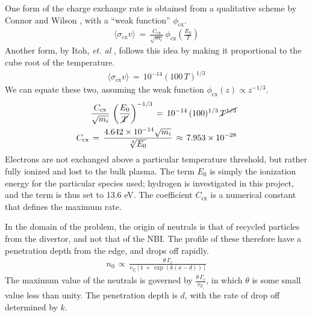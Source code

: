 One form of the charge exchange rate is obtained from a qualitative scheme by Connor and Wilson \cite{connor_review_2000}, with a ``weak function'' $\phi_\text{cx}$.
\begin{align} %
	\langle \sigma_\text{cx} v\rangle \,=\, \frac{C_\text{cx}}{\sqrt{m_i}} \,
		\phi_\text{cx}\left(\frac{E_0}{T}\right) \label{eq:connor_cx_rate}
\end{align}
Another form, by Itoh, \emph{et. al} \cite{itoh_model_1989}, follows this idea by making it proportional to the cube root of the temperature.
\begin{align} %
	\langle \sigma_\text{cx} v\rangle \,=\, 10^{-14}
		\left(100 \, T\right)^{1/3} \label{eq:itoh_cx_rate}
\end{align}
We can equate these two, assuming the weak function $\phi_\text{cx}(z) \propto z^{-1/3}$.
\begin{align}
	\frac{C_\text{cx}}{\sqrt{m_i}} \, \left(\frac{E_0}{\cancel{T}}\right)^{-1/3}
		\,=\, 10^{-14} \, (100)^{1/3} \, \cancel{T^{1/3}} \\
	C_\text{cx} \,=\, \frac{4.642\times 10^{-14} \sqrt{m_i}}{\sqrt[3]{E_0}}
		\,\approx\, 7.953\times 10^{-28}
\end{align}
Electrons are not exchanged above a particular temperature threshold, but rather fully ionized and lost to the bulk plasma.
The term $E_0$ is simply the ionization energy for the particular species used; hydrogen is investigated in this project, and the term is thus set to 13.6 eV.
The coefficient $C_\text{cx}$ is a numerical constant that defines the maximum rate.

In the domain of the problem, the origin of neutrals is that of recycled particles from the divertor, and not that of the NBI.
The profile of these therefore have a penetration depth from the edge, and drops off rapidly.
\begin{align} %
	n_0 \,\propto\, \frac{\theta\,\Gamma_c}{v_{T_i}\left[1 \,+\,
		\exp{(k(x - d))}\right]} \label{eq:neutral_density}
\end{align}
The maximum value of the neutrals is governed by $\frac{\theta\,\Gamma_c}{v_{T_i}}$, in which $\theta$ is some small value less than unity.
The penetration depth is $d$, with the rate of drop off determined by $k$.

